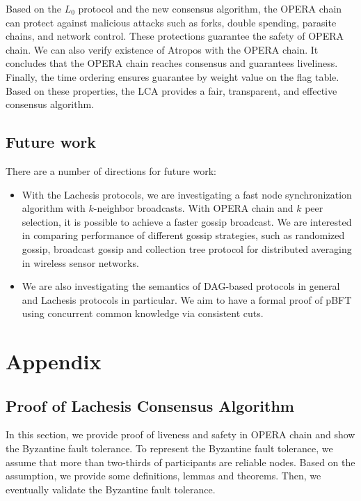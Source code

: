 \documentclass[preprint,12pt]{elsarticle}
\begin{document}
Based on the  $L_0$ protocol and the new consensus algorithm, the OPERA chain can protect against malicious attacks such as forks, double spending, parasite chains, and network control. These protections guarantee the safety of OPERA chain. We can also verify existence of Atropos with the OPERA chain. It concludes that the OPERA chain reaches consensus and guarantees liveliness. 
Finally, the time ordering ensures guarantee by weight value on the flag table. Based on these properties, the LCA provides a fair, transparent, and effective consensus algorithm.

\subsection{Future work}
There are a number of directions for future work:

\begin{itemize}
	\item With the Lachesis protocols, we are investigating a fast node synchronization algorithm with $k$-neighbor broadcasts.
	With OPERA chain and $k$ peer selection, it is possible to achieve a faster gossip broadcast. We are interested in comparing performance of different gossip strategies, such as randomized gossip, broadcast gossip and collection tree protocol for distributed averaging in wireless sensor networks.
	\item We are also investigating the semantics of DAG-based protocols in general and Lachesis protocols in particular. We aim to have a formal proof of pBFT using concurrent common knowledge via consistent cuts. 
\end{itemize}

\newpage
\section{Appendix}\label{se:appendix}
\subsection{Proof of Lachesis Consensus Algorithm}\label{se:proof}
In this section, we provide proof of liveness and safety in OPERA chain and show the Byzantine fault tolerance. To represent the Byzantine fault tolerance, we assume that more than two-thirds of participants are reliable nodes. Based on the assumption, we provide some definitions, lemmas and theorems. Then, we eventually validate the Byzantine fault tolerance. 
\end{document}

